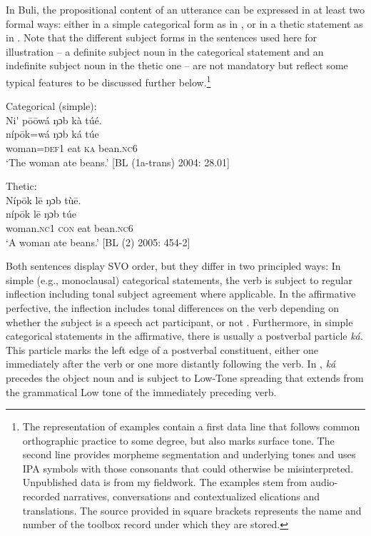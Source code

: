 \documentclass[output=paper]{langsci/langscibook}
\begin{document}
In Buli, the propositional content of an utterance can be expressed in at least two formal ways: either in a simple categorical form as in , or in a thetic statement as in . Note that the different subject forms in the sentences used here for illustration – a definite subject noun in the categorical statement and an indefinite subject noun in the thetic one – are not mandatory but reflect some typical features to be discussed further below.\footnote{The representation of examples contain a first data line that follows common orthographic practice to some degree, but also marks surface tone. The second line provides morpheme segmentation and underlying tones and uses IPA symbols with those consonants that could otherwise be misinterpreted. Unpublished data is from my fieldwork. The examples stem from audio-recorded narratives, conversations and contextualized elications and translations. The source provided in square brackets represents the name and number of the toolbox record under which they are stored.} 
 
\ea\label{ex:schwarz:5}
 Categorical (simple):  \\
\glll Ni\'{} p\={o}\={o}wá  ŋɔb  kà  túé.\\
    \textup{níp\={o}k=wá } \textup{ŋɔb  k}\textup{á}\textup{  túe}\\
     woman=\textsc{def}1  eat  \textsc{ka}  bean.\textsc{nc}6\\
\glt ‘The woman ate beans.’ [BL (1a-trans) 2004: 28.01]
\z

\ea\label{ex:schwarz:6}
 Thetic:\\
\glll Níp\={o}k    l\={e}  ŋɔb  tù\={e}.\\
     \textup{níp\={o}k    l\={e} } \textup{ŋɔb  túe}\\
     woman.\textsc{nc}1  \textsc{con}  eat  bean.\textsc{nc}6\\
\glt ‘A woman ate beans.’ [BL (2) 2005: 454-2]
\z

Both sentences display SVO order, but they differ in two principled ways: In simple (e.g., monoclausal) categorical statements, the verb is subject to regular inflection including tonal subject agreement where applicable. In the affirmative perfective, the inflection includes tonal differences on the verb depending on whether the subject is a speech act participant, or not \citep{Schwarz2007}. Furthermore, in simple categorical statements in the affirmative, there is usually a postverbal particle \textit{ká.} This particle marks the left edge of a postverbal constituent, either one immediately after the verb or one more distantly following the verb. In , \textit{ká} precedes the object noun and is subject to Low-Tone spreading that extends from the grammatical Low tone of the immediately preceding verb.
\end{document}
